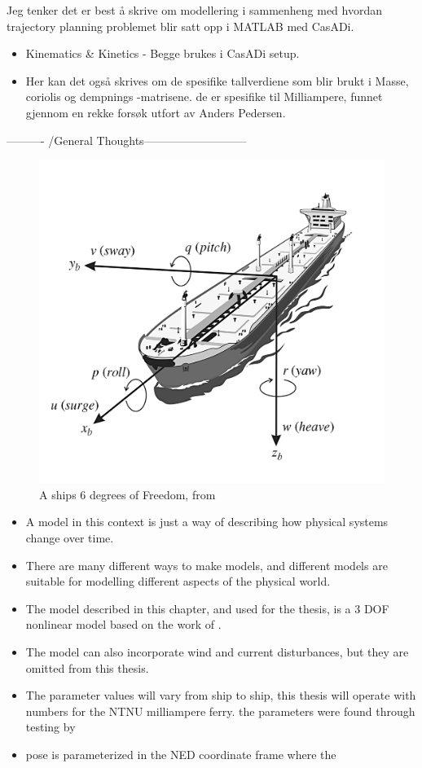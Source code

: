 Jeg tenker det er best å skrive om modellering i sammenheng med hvordan trajectory planning problemet blir satt opp i MATLAB med CasADi.
\begin{itemize}
    \item Kinematics \& Kinetics -\> Begge brukes i CasADi setup.
    \item Her kan det også skrives om de spesifike tallverdiene som blir brukt i Masse, coriolis og dempnings -matrisene.
    de er spesifike til Milliampere, funnet gjennom en rekke forsøk utfort av Anders Pedersen.
\end{itemize}
---------- /General Thoughts--------------------------- 
\fi
\begin{figure}
    \centering
    \includegraphics[height=0.35\textheight]{Images/SHIPDOF_FOSSEN.png}
    \caption{A ships 6 degrees of Freedom, from \cite{fossen2011handbook}}
    \label{FIG: Ship DOF}
\end{figure}
\iffalse
\begin{itemize}
    \item A model in this context is just a way of describing how physical systems change over time.
    \item There are many different ways to make models, and different models are suitable for modelling different aspects of the physical world.
    \item The model described in this chapter, and used for the thesis, is a 3 \gls{DOF} nonlinear model based on the work of \cite{fossen2011handbook}.
    \item The model can also incorporate wind and current disturbances, but they are omitted from this thesis.
    \item The parameter values will vary from ship to ship, this thesis will operate with numbers for the NTNU milliampere ferry.
    the parameters were found through testing by \cite{andersson2019casadi}
    \item pose is parameterized in the \gls{NED} coordinate frame where the 
\end{itemize}
